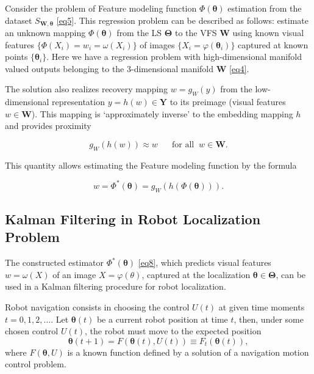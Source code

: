 \documentclass[conference]{IEEEtran} %
\def\mbW{\mathbf{W}}
\def\mbTheta{{\bm\Theta}}
\def\mbtheta{{\bm\theta}}
\def\mbY{\mathbf{Y}}
\begin{document}
Consider the problem of Feature modeling function $\Phi(\mbtheta)$ estimation from the dataset $S_{\mathbf{W},\mbtheta}$ \eqref{eq5}. This regression problem can be described as follows: estimate an unknown mapping $\Phi(\mbtheta)$ from the LS $\mbTheta$ to the VFS $\mbW$ using known visual features $\{\Phi(X_i) = w_i = \omega(X_i)\}$ of images $\{X_i = \varphi(\mbtheta_i)\}$ captured at known points $\{\mbtheta_i\}$. Here we have a regression problem with high-dimensional manifold valued outputs belonging to the $3$-dimensional manifold $\mbW$ \eqref{eq4}.

The solution \cite{bib20} also realizes recovery mapping $w = g_W(y)$ from the low-dimensional representation $y = h(w) \in \mbY$ to its preimage (visual features $w \in \mbW$). This mapping is `approximately inverse' to the embedding mapping $h$ and provides proximity

\begin{equation}
\label{eq7}
	g_W(h(w)) \approx w \quad\,\,\,\,\text{for all} \;\; w \in \mbW.
\end{equation}

This quantity allows estimating the Feature modeling function by the formula

\begin{equation}
\label{eq8}
	w = \Phi^*(\mbtheta) = g_W(h(\Phi(\mbtheta))).
\end{equation}

\subsection{Kalman Filtering in Robot Localization Problem}

The constructed estimator $\Phi^*(\mbtheta)$ \eqref{eq8}, which predicts  visual features $w = \omega(X)$ of an image $X = \varphi(\theta)$, captured at the localization $\mbtheta \in \mbTheta$, can be used in a Kalman filtering procedure \cite{bib5} for robot localization.

Robot navigation consists in choosing the control $U(t)$ at given time moments $t = 0, 1, 2, \dots$. Let $\mbtheta(t)$ be a current robot position at time $t$, then, under some chosen control $U(t)$, the robot must move to the expected position
\begin{equation}
\label{eq9}
	\mbtheta(t+1) = F(\mbtheta(t), U(t)) \equiv F_t(\mbtheta(t)),
\end{equation}
where $F(\mbtheta, U)$ is a known function defined by a solution of a navigation motion control problem.
\end{document}
